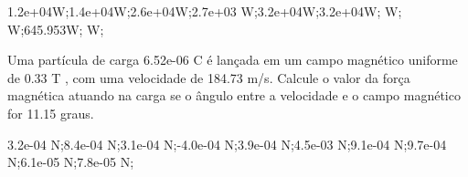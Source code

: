 \documentclass[12pt, addpoints]{exam}
\begin{document}
\begin{questions}
\begin{multicols*}{2}
\begin{oneparchoices}
\choice 1.2e+04W;\choice 1.4e+04W;\choice 2.6e+04W;\choice 2.7e+03 W;\choice 3.2e+04W;\choice 3.2e+04W; W; W;\choice 645.953W; W;\end{oneparchoices}
\question[20] Uma partícula de carga 6.52e-06 C é lançada em um campo magnético uniforme de    0.33 T , com uma velocidade de 184.73 m/s. Calcule o valor da força magnética atuando na carga se o ângulo entre a velocidade e o campo magnético for   11.15 graus.

\begin{oneparchoices}
\choice 3.2e-04 N;\choice 8.4e-04 N;\choice 3.1e-04 N;\choice -4.0e-04 N;\choice 3.9e-04 N;\choice 4.5e-03 N;\choice 9.1e-04 N;\choice 9.7e-04 N;\choice 6.1e-05 N;\choice 7.8e-05 N;\end{oneparchoices}
\end{multicols*}
\end{questions}
\newpage
\end{document}
